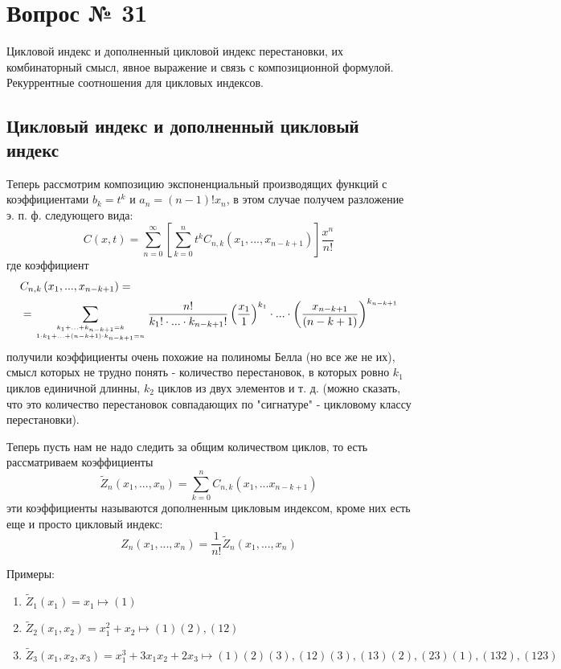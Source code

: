 \chapter{Вопрос № 31}

Цикловой индекс и дополненный цикловой индекс перестановки, их комбинаторный смысл, явное выражение и связь с композиционной формулой. Рекуррентные соотношения для цикловых индексов.

\section{Цикловый индекс и дополненный цикловый индекс}

Теперь рассмотрим композицию экспоненциальный производящих функций с коэффициентами $b_k = t^k$ и $a_n = \left(n-1\right)!x_n$, в этом случае получем разложение э. п. ф. следующего вида:
\[
	C\left(x,t\right) = \sum_{n=0}^{\infty} \left[\sum_{k=0}^n t^k C_{n,k}\left(x_1,...,x_{n-k+1}\right)\right]\frac{x^n}{n!}
\]
где коэффициент
\[
	\begin{split}
		&C_{n,k}\left(x_1, ... , x_{n-k+1}\right) =\\
		& = \sum_{
			k_1 + ... + k_{n-k+1} = k
			\atop
			1\cdot k_1 + ... +\left(n-k+1\right)\cdot k_{n-k+1} = n
			} \frac{n!}{k_1!\cdot ... \cdot k_{n-k+1}!} \left(\frac{x_1}{1}\right)^{k_1}\cdot...\cdot\left(\frac{x_{n-k+1}}{\left(n-k+1\right)}\right)^{k_{n-k+1}}
	\end{split}
\]
получили коэффициенты очень похожие на полиномы Белла (но все же не их), смысл которых не трудно понять - количество перестановок, в которых ровно $k_1$ циклов единичной длинны, $k_2$ циклов из двух элементов и т. д. (можно сказать, что это количество перестановок совпадающих по "сигнатуре" - цикловому классу перестановки).

Теперь пусть нам не надо следить за общим количеством циклов, то есть рассматриваем коэффициенты
\[
	\tilde Z_n \left(x_1, ... , x_n\right) = \sum_{k=0}^n C_{n,k}\left(x_1, ... x_{n-k+1}\right)
\]
эти коэффициенты называются дополненным цикловым индексом, кроме них есть еще и просто цикловый индекс:
\[
	Z_n \left(x_1, ..., x_n\right) = \frac{1}{n!} \tilde Z_n \left(x_1, ..., x_n\right)
\]

Примеры:
\begin{enumerate}
\item $\tilde Z_1 \left(x_1\right) = x_1 \mapsto \left(1\right)$

\item $\tilde Z_2 \left(x_1,x_2\right) = x_1^2 + x_2 \mapsto \left(1\right)\left(2\right),\left(12\right)$

\item $\tilde Z_3 \left(x_1, x_2, x_3\right) = x_1^3 + 3x_1x_2 + 2x_3 \mapsto \left(1\right)\left(2\right)\left(3\right),\left(12\right)\left(3\right),\left(13\right)\left(2\right), \left(23\right)\left(1\right), \left(132\right),\left(123\right)$
\end{enumerate}

